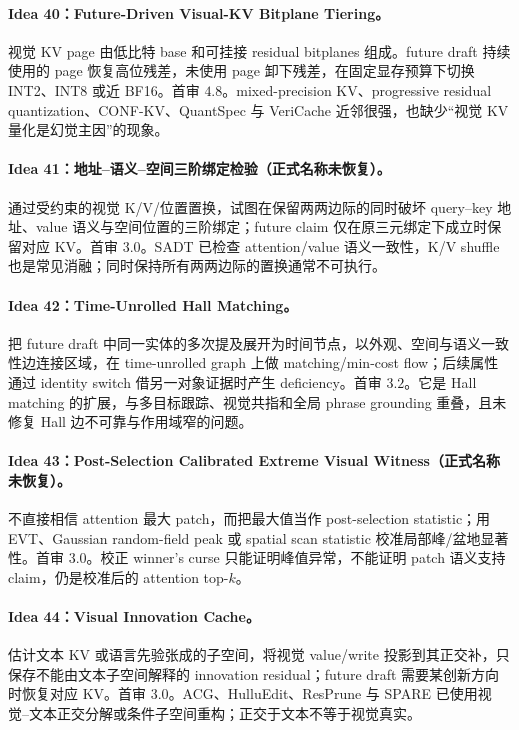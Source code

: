 \documentclass[UTF8,zihao=-4,a4paper]{ctexart}
\begin{document}
\paragraph{Idea 40：Future-Driven Visual-KV Bitplane Tiering。}
视觉 KV page 由低比特 base 和可挂接 residual bitplanes 组成。future draft 持续使用的 page 恢复高位残差，未使用 page 卸下残差，在固定显存预算下切换 INT2、INT8 或近 BF16。首审 $4.8$。mixed-precision KV、progressive residual quantization、CONF-KV、QuantSpec 与 VeriCache 近邻很强，也缺少“视觉 KV 量化是幻觉主因”的现象。

\paragraph{Idea 41：地址--语义--空间三阶绑定检验（正式名称未恢复）。}
通过受约束的视觉 K/V/位置置换，试图在保留两两边际的同时破坏 query--key 地址、value 语义与空间位置的三阶绑定；future claim 仅在原三元绑定下成立时保留对应 KV。首审 $3.0$。SADT 已检查 attention/value 语义一致性，K/V shuffle 也是常见消融；同时保持所有两两边际的置换通常不可执行。

\paragraph{Idea 42：Time-Unrolled Hall Matching。}
把 future draft 中同一实体的多次提及展开为时间节点，以外观、空间与语义一致性边连接区域，在 time-unrolled graph 上做 matching/min-cost flow；后续属性通过 identity switch 借另一对象证据时产生 deficiency。首审 $3.2$。它是 Hall matching 的扩展，与多目标跟踪、视觉共指和全局 phrase grounding 重叠，且未修复 Hall 边不可靠与作用域窄的问题。

\paragraph{Idea 43：Post-Selection Calibrated Extreme Visual Witness（正式名称未恢复）。}
不直接相信 attention 最大 patch，而把最大值当作 post-selection statistic；用 EVT、Gaussian random-field peak 或 spatial scan statistic 校准局部峰/盆地显著性。首审 $3.0$。校正 winner's curse 只能证明峰值异常，不能证明 patch 语义支持 claim，仍是校准后的 attention top-$k$。

\paragraph{Idea 44：Visual Innovation Cache。}
估计文本 KV 或语言先验张成的子空间，将视觉 value/write 投影到其正交补，只保存不能由文本子空间解释的 innovation residual；future draft 需要某创新方向时恢复对应 KV。首审 $3.0$。ACG、HulluEdit、ResPrune 与 SPARE 已使用视觉--文本正交分解或条件子空间重构；正交于文本不等于视觉真实。
\end{document}
